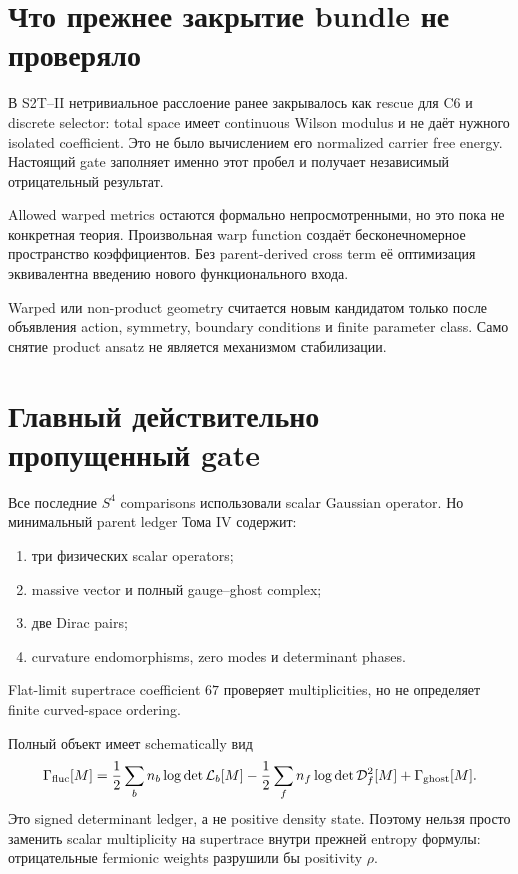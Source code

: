 \section{Что прежнее закрытие bundle не проверяло}

В S2T--II нетривиальное расслоение ранее закрывалось как rescue для C6 и
discrete selector: total space имеет continuous Wilson modulus и не даёт
нужного isolated coefficient. Это не было вычислением его normalized
carrier free energy. Настоящий gate заполняет именно этот пробел и получает
независимый отрицательный результат.

Allowed warped metrics остаются формально непросмотренными, но это пока не
конкретная теория. Произвольная warp function создаёт бесконечномерное
пространство коэффициентов. Без parent-derived cross term её оптимизация
эквивалентна введению нового функционального входа.

\begin{nogocriterion}
Warped или non-product geometry считается новым кандидатом только после
объявления action, symmetry, boundary conditions и finite parameter class.
Само снятие product ansatz не является механизмом стабилизации.
\end{nogocriterion}

\section{Главный действительно пропущенный gate}

Все последние \(S^4\) comparisons использовали scalar Gaussian operator.
Но минимальный parent ledger Тома IV содержит:
\begin{enumerate}
 \item три физических scalar operators;
 \item massive vector и полный gauge--ghost complex;
 \item две Dirac pairs;
 \item curvature endomorphisms, zero modes и determinant phases.
\end{enumerate}
Flat-limit supertrace coefficient \(67\) проверяет multiplicities, но не
определяет finite curved-space ordering.

Полный объект имеет schematically вид
\begin{equation}
 \Gamma_{\rm fluc}[M]
 =\frac12\sum_b n_b\log\det\mathcal L_b[M]
 -\frac12\sum_f n_f\log\det\mathcal D_f^2[M]
 +\Gamma_{\rm ghost}[M].
 \label{eq:full-field-carrier-fluctuation}
\end{equation}
Это signed determinant ledger, а не positive density state. Поэтому нельзя
просто заменить scalar multiplicity на supertrace внутри прежней entropy
формулы: отрицательные fermionic weights разрушили бы positivity \(\rho\).

